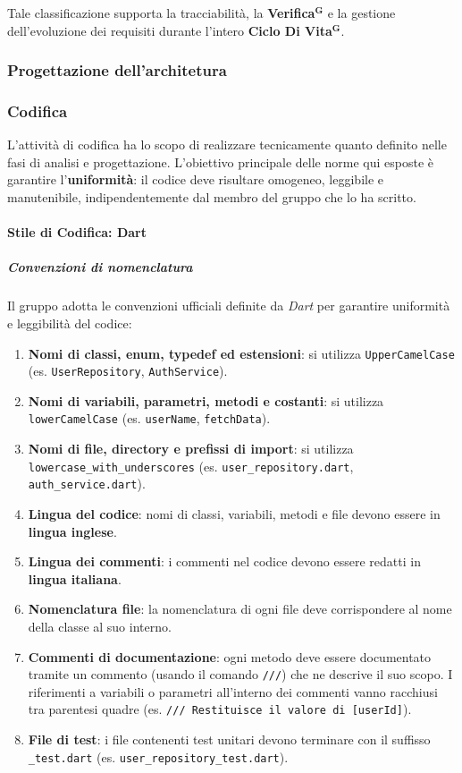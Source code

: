 \documentclass[a4paper,12pt]{article}
\newcommand{\term}[1]{\textbf{#1}$^\mathbf{G}$}
\begin{document}
Tale classificazione supporta la tracciabilità, la \term{Verifica} e la gestione dell’evoluzione dei requisiti durante l’intero \term{Ciclo Di Vita}.

\subsubsection{Progettazione dell'architetura} \label{subsubsec:progettazione-arc}


\subsubsection{Codifica}
L'attività di codifica ha lo scopo di realizzare tecnicamente quanto definito nelle fasi di analisi e progettazione.
L'obiettivo principale delle norme qui esposte è garantire l'\textbf{uniformità}: il codice deve risultare omogeneo, leggibile e manutenibile, indipendentemente dal membro del gruppo che lo ha scritto.

\paragraph{Stile di Codifica: Dart} \label{par:stile-cod-dart}

\subparagraph{Convenzioni di nomenclatura}
Il gruppo adotta le convenzioni ufficiali definite da \textit{Dart} per garantire uniformità e leggibilità del codice:
\begin{enumerate}
    \item \textbf{Nomi di classi, enum, typedef ed estensioni}: si utilizza \texttt{UpperCamelCase} (es. \texttt{UserRepository}, \texttt{AuthService}).
    \item \textbf{Nomi di variabili, parametri, metodi e costanti}: si utilizza \texttt{lowerCamelCase} (es. \texttt{userName}, \texttt{fetchData}).
    \item \textbf{Nomi di file, directory e prefissi di import}: si utilizza \texttt{lowercase\_with\_underscores} (es. \texttt{user\_repository.dart}, \texttt{auth\_service.dart}).
    \item \textbf{Lingua del codice}: nomi di classi, variabili, metodi e file devono essere in \textbf{lingua inglese}.
    \item \textbf{Lingua dei commenti}: i commenti nel codice devono essere redatti in \textbf{lingua italiana}.
    \item \textbf{Nomenclatura file}: la nomenclatura di ogni file deve corrispondere al nome della classe al suo interno.
    \item \textbf{Commenti di documentazione}: ogni metodo deve essere documentato tramite un commento (usando il comando \texttt{///}) che ne descrive il suo scopo.
    I riferimenti a variabili o parametri all'interno dei commenti vanno racchiusi tra parentesi quadre (es. \texttt{/// Restituisce il valore di [userId]}).
    \item \textbf{File di test}: i file contenenti test unitari devono terminare con il suffisso \texttt{\_test.dart} (es. \texttt{user\_repository\_test.dart}).
\end{enumerate}
\end{document}

